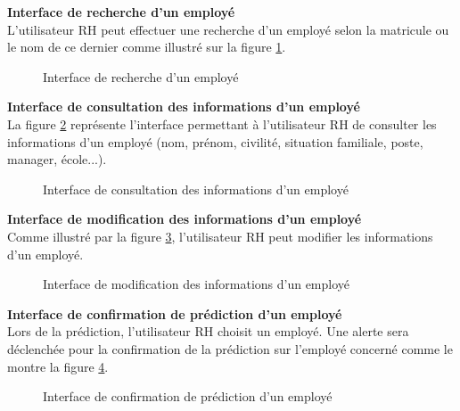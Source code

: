  
\newpage   
\textbf{Interface de recherche d'un employé}\\
L'utilisateur RH peut effectuer une recherche d'un employé selon la matricule ou le nom de ce dernier comme illustré sur la figure \ref{fig:realisationPFe_sprint2_recherche}.

    \begin{figure}[htpb]
    \centering
    \caption{Interface de recherche d'un employé}
    \label{fig:realisationPFe_sprint2_recherche}
    \end{figure}


\textbf{Interface de consultation des informations d'un employé}\\
La figure \ref{fig:realisationPFe_sprint2_info} représente l'interface permettant à l'utilisateur RH de consulter les informations d'un employé (nom, prénom, civilité, situation familiale, poste, manager, école...).
    \begin{figure}[htpb]
    \centering
    \caption{Interface de consultation des informations d'un employé}
    \label{fig:realisationPFe_sprint2_info}
    \end{figure}
\newpage
\textbf{Interface de modification des informations d'un employé}\\
Comme illustré par la figure \ref{fig:realisationPFe_sprint2_modif}, l'utilisateur RH peut modifier les informations d'un employé.

    \begin{figure}[htpb]
    \centering
    \caption{Interface de modification des informations d'un employé}
    \label{fig:realisationPFe_sprint2_modif}
    \end{figure}
    

\textbf{Interface de confirmation de prédiction d'un employé}\\
Lors de la prédiction, l'utilisateur RH choisit un employé. Une alerte sera déclenchée pour la confirmation de la prédiction sur l'employé concerné comme le montre la figure \ref{fig:realisationPFe_sprint2_confirm_prediction}.
    \begin{figure}[htpb]
    \centering
    \caption{Interface de confirmation de prédiction d'un employé}
    \label{fig:realisationPFe_sprint2_confirm_prediction}
    \end{figure}
    
